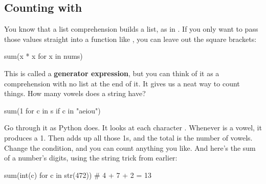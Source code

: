 \documentclass[10pt,a4paper]{article}
\begin{document}
\subsection{Counting with }
You know that a list comprehension builds a list, as in . If you only want to pass those values straight into a function like , you can leave out the square brackets:
\begin{pycode}
sum(x * x for x in nums)
\end{pycode}
This is called a \textbf{generator expression}, but you can think of it as a comprehension with no list at the end of it.
It gives us a neat way to count things. How many vowels does a string have?
\begin{pycode}
sum(1 for c in s if c in "aeiou")
\end{pycode}
Go through it as Python does. It looks at each character . Whenever  is a vowel, it produces a 1. Then  adds up all those 1s, and the total is the number of vowels. Change the condition, and you can count anything you like.
And here’s the sum of a number’s digits, using the string trick from earlier:
\begin{pycode}
sum(int(c) for c in str(472))     # 4 + 7 + 2 = 13
\end{pycode}
\end{document}
